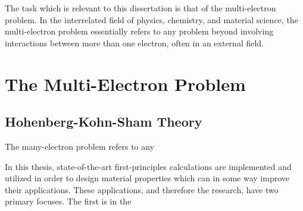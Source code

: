 The task which is relevant to this dissertation is that of the multi-electron problem. In the interrelated field of physics, chemistry, and material science,  the multi-electron problem essentially refers to any problem beyond involving interactions between more than one electron, often in an external field.


\section{The Multi-Electron Problem}

\subsection{Hohenberg-Kohn-Sham Theory}

The many-electron problem refers to any 

In this thesis, state-of-the-art first-principles calculations are implemented and utilized in order to design material properties which can in some way improve their applications. These applications, and therefore the research, have two primary focuses. The first is in the 